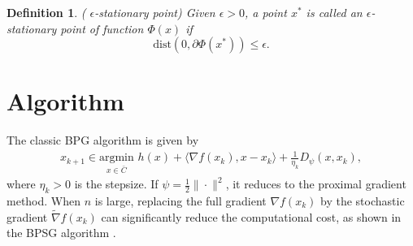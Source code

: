 \documentclass[letterpaper]{article} %
\newtheorem{definition}{Definition}
\begin{document}
	\begin{definition} \label{stationary-point} 
		(\cite{Lan2020First} $\epsilon$-stationary point) 
		Given $\epsilon>0$, a point $x^{*}$ is called an $\epsilon$-stationary point of function $\Phi(x)$ if
		\[
		\mbox{dist}(0,\partial \Phi(x^{*}))\le\epsilon.
		\]
	\end{definition}
	
	\section{Algorithm}\label{algorithm} 
	The classic BPG algorithm \cite{BolteSTV18First}  is given by
	\begin{align*}
		x_{k+1}\in\underset{x\in\bar{C}}{\text{argmin}} \,\, h(x)+\langle \nabla f(x_{k}),x-x_{k}\rangle +\frac{1}{\eta_{k}}D_{\psi}(x,x_{k}),
	\end{align*}
	where $\eta_{k}>0$ is the stepsize. If $\psi=\frac{1}{2}\|\cdot\|^{2}$, it reduces to  the   proximal gradient method. 
	When $n$ is large, replacing the full gradient $\nabla f(x_{k})$   by the stochastic gradient $\tilde{\nabla}f(x_{k})$ can significantly reduce the computational cost, as shown in the BPSG algorithm \cite{WangH23}.
	
\end{document}
